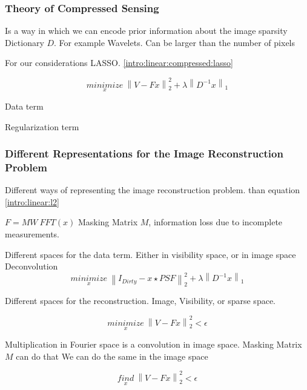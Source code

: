 \subsubsection{Theory of Compressed Sensing}
Is a way in which we can encode prior information about the image
sparsity
Dictionary $D$. For example Wavelets. Can be larger than the number of pixels

For our considerations LASSO. \eqref{intro:linear:compressed:lasso}

\begin{equation}\label{intro:linear:compressed:lasso}
\underset{x}{minimize} \: \left \| V - Fx \right \|_2^2 + \lambda \left \| D^{-1}x \right \|_1 
\end{equation}

Data term

Regularization term


\subsubsection{Different Representations for the Image Reconstruction Problem}
Different ways of representing the image reconstruction problem. than equation \eqref{intro:linear:l2}

$F = M W\: FFT(x)$
Masking Matrix $M$, information loss due to incomplete measurements. 

Different spaces for the data term. Either in visibility space, or in image space
Deconvolution
\begin{equation}\label{intro:linear:reprs:deconv}
\underset{x}{minimize} \: \left \| I_{Dirty} - x \star PSF \right \|_2^2 + \lambda \left \| D^{-1}x \right \|_1 
\end{equation}

Different spaces for the reconstruction. Image, Visibility, or sparse space.


\begin{equation}\label{intro:representation:inpainting}
\underset{x}{minimize} \: \left \| V - Fx \right \|_2^2 < \epsilon
\end{equation}

Multiplication in Fourier space is a convolution in image space. Masking Matrix $M$ can do that
We can do the same in the image space

\begin{equation}\label{intro:representation:deconv}
\underset{x}{find} \: \left \| V - Fx \right \|_2^2 < \epsilon
\end{equation}

